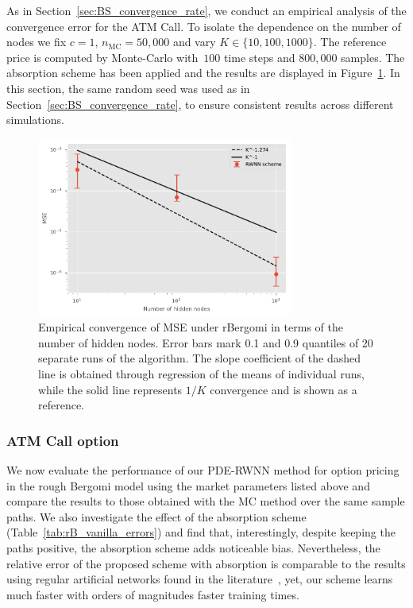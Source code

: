 As in Section~\ref{sec:BS_convergence_rate}, we conduct an empirical analysis of the convergence error for the ATM Call. 
To isolate the dependence on the number of nodes we fix $c=1$, $n_{\mathrm{MC}}=50,000$ and vary $K\in\{10, 100, 1000\}$. 
The reference price is computed by Monte-Carlo with~$100$ time steps and $800,000$ samples. 
The absorption scheme has been applied and the results are displayed in Figure~\ref{fig:rBconvergence}. 
In this section, the same random seed was used as in Section~\ref{sec:BS_convergence_rate}, to ensure consistent results across different simulations.

\begin{figure}[hbt!]
    \centering
    \includegraphics[width=0.75\textwidth]{content/reschap2/Figures/rBergomi_convergence_K_1e3.pdf}
    \caption{Empirical convergence of MSE under rBergomi in terms of the number of hidden nodes. Error bars mark 0.1 and 0.9 quantiles of 20 separate runs of the algorithm. The slope coefficient of the dashed line is obtained through regression of the means of individual runs, while the solid line represents $1/K$ convergence and is shown as a reference.}
    \label{fig:rBconvergence}
\end{figure}

\subsubsection{ATM Call option}\label{sec:resutls_call_rB}

We now evaluate the performance of our PDE-RWNN method for option pricing in the rough Bergomi model using the market parameters listed above and compare the results to those obtained with the MC method over the same sample paths. We also investigate the effect of the absorption scheme (Table~\ref{tab:rB_vanilla_errors}) and find that, interestingly, despite keeping the paths positive, the absorption scheme adds noticeable bias. 
Nevertheless, the relative error of the proposed scheme with absorption 
is comparable to the results using regular artificial networks found in the literature~\cite[Table~1]{Bayer2022PricingSPDEs}, yet, our scheme learns much faster with orders of magnitudes faster training times.

